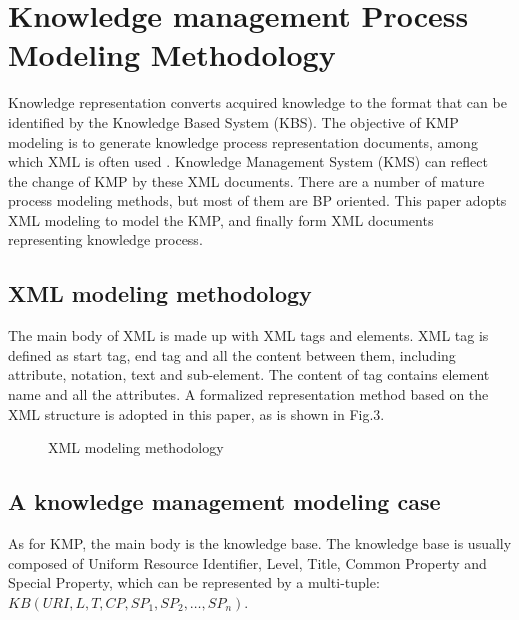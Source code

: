 \documentclass{elsarticle}
\begin{document}
\section{ Knowledge management Process Modeling
Methodology}
\label{sec:knowl-manag-proc-1}

\textrm{Knowledge representation converts acquired knowledge to the
format that can be identified by the Knowledge Based System (KBS)\cite{berggren1998knowledge}. The
objective of KMP modeling is to generate knowledge process
representation documents, among which XML is often used
\cite{jovanovic2005achieving}. Knowledge
Management System (KMS) can reflect the change of KMP by these XML
documents. There are a number of mature process modeling methods, but
most of them are BP oriented. This paper adopts XML modeling to model the KMP, and finally
form XML documents representing knowledge process.}

\subsection{ XML modeling methodology}
\label{sec:xml-model-meth}




\textrm{The main body of XML is made up with XML tags and elements. XML
tag is defined as start tag, end tag and all the content between them,
including attribute, notation, text and sub-element. The content of tag
contains element name and all the attributes. A formalized
representation method based on the XML structure is adopted in this
paper, as is shown in Fig.3.}

  \begin{figure}[ht]
    \centering
    \scalebox{0.75}{\texttt{[image: 03]}}
    \caption{ XML modeling methodology}
  \end{figure}


\subsection{A knowledge management modeling case}


As for KMP, the main body is the knowledge base. The knowledge
base is usually composed of Uniform Resource Identifier, Level, Title,
Common Property and Special Property, which can be represented by a
multi-tuple: $KB(URI, L, T, CP, SP_1, SP_2,\ldots,SP_n)$.
\end{document}
